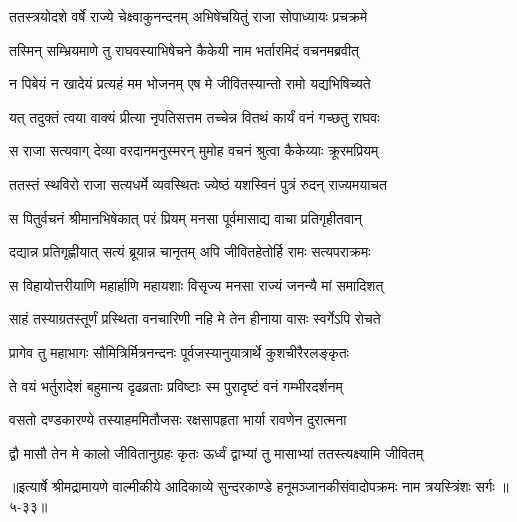 \twolineshloka
{ततस्त्रयोदशे वर्षे राज्ये चेक्ष्वाकुनन्दनम्}
{अभिषेचयितुं राजा सोपाध्यायः प्रचक्रमे} %

\twolineshloka
{तस्मिन् सम्भ्रियमाणे तु राघवस्याभिषेचने}
{कैकेयी नाम भर्तारमिदं वचनमब्रवीत्} %

\twolineshloka
{न पिबेयं न खादेयं प्रत्यहं मम भोजनम्}
{एष मे जीवितस्यान्तो रामो यद्यभिषिच्यते} %

\twolineshloka
{यत् तदुक्तं त्वया वाक्यं प्रीत्या नृपतिसत्तम}
{तच्चेन्न वितथं कार्यं वनं गच्छतु राघवः} %

\twolineshloka
{स राजा सत्यवाग् देव्या वरदानमनुस्मरन्}
{मुमोह वचनं श्रुत्वा कैकेय्याः क्रूरमप्रियम्} %

\twolineshloka
{ततस्तं स्थविरो राजा सत्यधर्मे व्यवस्थितः}
{ज्येष्ठं यशस्विनं पुत्रं रुदन् राज्यमयाचत} %

\twolineshloka
{स पितुर्वचनं श्रीमानभिषेकात् परं प्रियम्}
{मनसा पूर्वमासाद्य वाचा प्रतिगृहीतवान्} %

\twolineshloka
{दद्यान्न प्रतिगृह्णीयात् सत्यं ब्रूयान्न चानृतम्}
{अपि जीवितहेतोर्हि रामः सत्यपराक्रमः} %

\twolineshloka
{स विहायोत्तरीयाणि महार्हाणि महायशाः}
{विसृज्य मनसा राज्यं जनन्यै मां समादिशत्} %

\twolineshloka
{साहं तस्याग्रतस्तूर्णं प्रस्थिता वनचारिणी}
{नहि मे तेन हीनाया वासः स्वर्गेऽपि रोचते} %

\twolineshloka
{प्रागेव तु महाभागः सौमित्रिर्मित्रनन्दनः}
{पूर्वजस्यानुयात्रार्थे कुशचीरैरलङ्कृतः} %

\twolineshloka
{ते वयं भर्तुरादेशं बहुमान्य दृढव्रताः}
{प्रविष्टाः स्म पुरादृष्टं वनं गम्भीरदर्शनम्} %

\twolineshloka
{वसतो दण्डकारण्ये तस्याहममितौजसः}
{रक्षसापहृता भार्या रावणेन दुरात्मना} %

\twolineshloka
{द्वौ मासौ तेन मे कालो जीवितानुग्रहः कृतः}
{ऊर्ध्वं द्वाभ्यां तु मासाभ्यां ततस्त्यक्ष्यामि जीवितम्} %


॥इत्यार्षे श्रीमद्रामायणे वाल्मीकीये आदिकाव्ये सुन्दरकाण्डे हनूमञ्जानकीसंवादोपक्रमः नाम त्रयस्त्रिंशः सर्गः ॥५-३३॥
